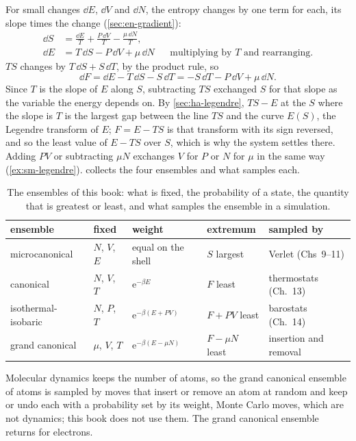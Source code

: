 For small changes $\dd E$, $\dd V$ and $\dd N$, the entropy changes by one
term for each, its slope times the change (\cref{sec:en-gradient}):
\begin{align*}
   \dd S &= \frac{\dd E}{T} + \frac{P\,\dd V}{T} - \frac{\mu\,\dd N}{T} ,\\
   \dd E &= T\,\dd S - P\,\dd V + \mu\,\dd N
   && \text{multiplying by $T$ and rearranging.}
\end{align*}
$TS$ changes by $T\,\dd S + S\,\dd T$, by the product rule, so
\begin{equation*}
   \dd F = \dd E - T\,\dd S - S\,\dd T = -S\,\dd T - P\,\dd V + \mu\,\dd N .
\end{equation*}
Since $T$ is the slope of $E$ along $S$, subtracting $TS$ exchanged $S$
for that slope as the variable the energy depends on. By
\cref{sec:ha-legendre}, $TS - E$ at the $S$ where the slope is $T$ is the
largest gap between the line $TS$ and the curve $E(S)$, the Legendre
transform of $E$; $F = E - TS$ is that transform with its sign reversed,
and so the least value of $E - TS$ over $S$, which is why the system
settles there. Adding $PV$ or subtracting $\mu N$ exchanges $V$ for $P$ or
$N$ for $\mu$ in the same way (\cref{ex:sm-legendre}).
 collects the four ensembles and what samples each.

\begin{table}[htb]
\centering
\caption{The ensembles of this book: what is fixed, the probability of a
state, the quantity that is greatest or least, and what samples the
ensemble in a simulation.}
\label{tab:sm-ensembles}
\small
\begin{tabular}{@{}lllll@{}}
\toprule
ensemble & fixed & weight & extremum & sampled by\\
\midrule
microcanonical & $N$, $V$, $E$ & equal on the shell & $S$ largest &
   Verlet (Chs~9--11)\\
canonical & $N$, $V$, $T$ & $\mathrm{e}^{-\beta E}$ & $F$ least &
   thermostats (Ch.~13)\\
isothermal-isobaric & $N$, $P$, $T$ & $\mathrm{e}^{-\beta(E + PV)}$ &
   $F + PV$ least & barostats (Ch.~14)\\
grand canonical & $\mu$, $V$, $T$ & $\mathrm{e}^{-\beta(E - \mu N)}$ &
   $F - \mu N$ least & insertion and removal\\
\bottomrule
\end{tabular}
\end{table}

Molecular dynamics keeps the number of atoms, so the grand canonical
ensemble of atoms is sampled by moves that insert or remove an atom at
random and keep or undo each with a probability set by its weight, Monte
Carlo moves, which are not dynamics; this book does not use them. The
grand canonical ensemble returns for electrons.

